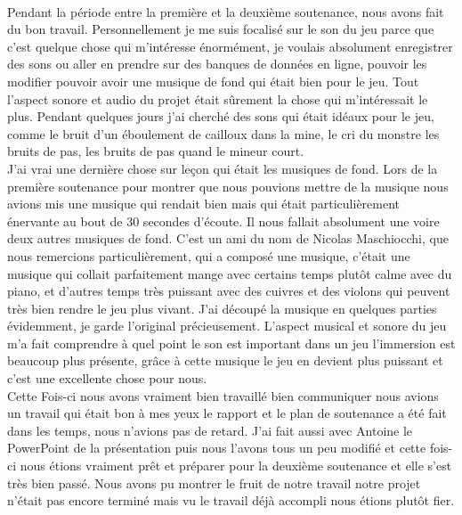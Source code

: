 \documentclass[titlepage, 13px, a4paper]{report}
\begin{document}
\paragraph{} \hspace{0pt}
Pendant la période entre la première et la deuxième soutenance, 
nous avons fait du bon travail. Personnellement je me suis focalisé sur 
le son du jeu parce que c’est quelque chose qui m’intéresse énormément, je voulais absolument enregistrer 
des sons ou aller en prendre sur des banques de données en ligne, pouvoir les modifier pouvoir avoir une 
musique de fond qui était bien pour le jeu. Tout l’aspect sonore et audio du projet était sûrement 
la chose qui m’intéressait le plus. Pendant quelques jours j’ai cherché des sons qui était idéaux pour le jeu, 
comme le bruit d’un éboulement de cailloux dans la mine, le cri du monstre les bruits de pas, les bruits de pas 
quand le mineur court. \\
J’ai vrai une dernière chose sur leçon 
qui était les musiques de fond. Lors de la première soutenance pour montrer que nous pouvions mettre de la 
musique nous avions mis une musique qui rendait bien mais qui était particulièrement énervante au bout de 30 secondes 
d’écoute. Il nous fallait absolument une voire deux autres musiques de fond. C’est un ami du nom de 
Nicolas Maschiocchi, que nous remercions particulièrement, qui a composé une musique, c’était une musique 
qui collait parfaitement mange avec certains temps plutôt calme avec du piano, et d’autres temps très puissant 
avec des cuivres et des violons qui peuvent très bien rendre le jeu plus vivant. J’ai découpé la musique en 
quelques parties évidemment, je garde l’original précieusement. L’aspect musical et sonore du jeu m’a fait 
comprendre à quel point le son est important dans un jeu l’immersion est beaucoup plus présente, grâce à 
cette musique le jeu en devient plus puissant et c’est une excellente chose pour nous. \\
Cette Fois-ci nous avons vraiment bien travaillé bien communiquer nous avions un travail qui était bon à mes yeux 
le rapport et le plan de soutenance a été fait dans les temps, nous n’avions pas de retard. J’ai fait aussi avec 
Antoine le PowerPoint de la présentation puis nous l’avons tous un peu modifié et cette fois-ci nous étions vraiment 
prêt et préparer pour la deuxième soutenance et elle s’est très bien passé. Nous avons pu montrer le fruit de notre 
travail notre projet n’était pas encore terminé mais vu le travail déjà accompli nous étions plutôt fier. \\
\end{document}
